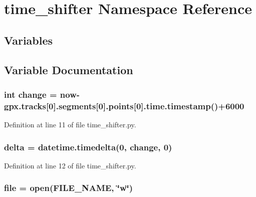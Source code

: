 \hypertarget{namespacetime__shifter}{}\section{time\+\_\+shifter Namespace Reference}
\label{namespacetime__shifter}
\subsection*{Variables}


\subsection{Variable Documentation}
\subsubsection[{\texorpdfstring{change}{change}}]{\setlength{\rightskip}{0pt plus 5cm}int change = {\bf now}-\/gpx.\+tracks\mbox{[}0\mbox{]}.segments\mbox{[}0\mbox{]}.points\mbox{[}0\mbox{]}.time.\+timestamp()+6000}\hypertarget{namespacetime__shifter_ac710c7bfde8686dcdfa07f1800ab01b5}{}\label{namespacetime__shifter_ac710c7bfde8686dcdfa07f1800ab01b5}


Definition at line 11 of file time\+\_\+shifter.\+py.

\subsubsection[{\texorpdfstring{delta}{delta}}]{\setlength{\rightskip}{0pt plus 5cm}delta = datetime.\+timedelta(0, {\bf change}, 0)}\hypertarget{namespacetime__shifter_a66db7c5e4e9699c54207ab857ae72cb7}{}\label{namespacetime__shifter_a66db7c5e4e9699c54207ab857ae72cb7}


Definition at line 12 of file time\+\_\+shifter.\+py.

\subsubsection[{\texorpdfstring{file}{file}}]{\setlength{\rightskip}{0pt plus 5cm}file = open(F\+I\+L\+E\+\_\+\+N\+A\+ME, \char`\"{}w\char`\"{})}\hypertarget{namespacetime__shifter_a40a5d58ffa6e88aa578d6683ac413105}{}\label{namespacetime__shifter_a40a5d58ffa6e88aa578d6683ac413105}


